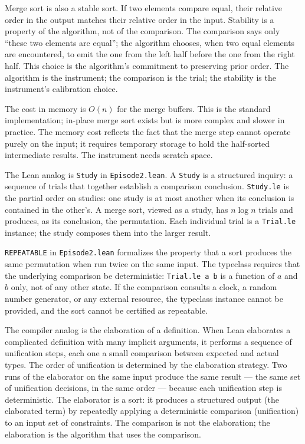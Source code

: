 Merge sort is also a stable sort. If two elements compare equal, their
relative order in the output matches their relative order in the input.
Stability is a property of the algorithm, not of the comparison. The
comparison says only ``these two elements are equal''; the algorithm
chooses, when two equal elements are encountered, to emit the one from
the left half before the one from the right half. This choice is the
algorithm's commitment to preserving prior order. The algorithm is the
instrument; the comparison is the trial; the stability is the
instrument's calibration choice.

The cost in memory is $O(n)$ for the merge buffers. This is the standard
implementation; in-place merge sort exists but is more complex and
slower in practice. The memory cost reflects the fact that the merge
step cannot operate purely on the input; it requires temporary storage
to hold the half-sorted intermediate results. The instrument needs
scratch space.

The Lean analog is \texttt{Study} in \texttt{Episode2.lean}. A
\texttt{Study} is a structured inquiry: a sequence of trials that
together establish a comparison conclusion. \texttt{Study.le} is the
partial order on studies: one study is at most another when its
conclusion is contained in the other's. A merge sort, viewed as a
study, has $n \log n$ trials and produces, as its conclusion, the
permutation. Each individual trial is a \texttt{Trial.le} instance; the
study composes them into the larger result.

\texttt{REPEATABLE} in \texttt{Episode2.lean} formalizes the property
that a sort produces the same permutation when run twice on the same
input. The typeclass requires that the underlying comparison be
deterministic: \texttt{Trial.le a b} is a function of $a$ and $b$ only,
not of any other state. If the comparison consults a clock, a random
number generator, or any external resource, the typeclass instance
cannot be provided, and the sort cannot be certified as repeatable.

The compiler analog is the elaboration of a definition. When Lean
elaborates a complicated definition with many implicit arguments, it
performs a sequence of unification steps, each one a small comparison
between expected and actual types. The order of unification is
determined by the elaboration strategy. Two runs of the elaborator on
the same input produce the same result --- the same set of unification
decisions, in the same order --- because each unification step is
deterministic. The elaborator is a sort: it produces a structured
output (the elaborated term) by repeatedly applying a deterministic
comparison (unification) to an input set of constraints. The
comparison is not the elaboration; the elaboration is the algorithm
that uses the comparison.


